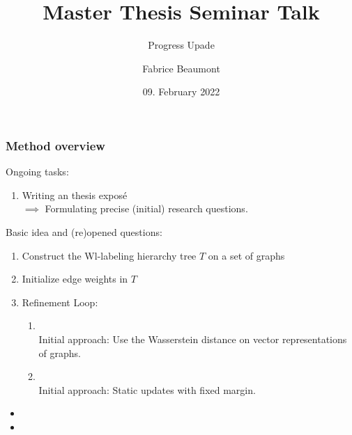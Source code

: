 

\title[MA Seminar Talk - Progress]{Master Thesis Seminar Talk}
\subtitle{Progress Upade}
\author[F. Beaumont]{Fabrice Beaumont}
\date{09. February 2022}



\begin{frame}
	\titlepage
\end{frame}

\begin{frame}
\frametitle{Method overview} \vspace{-1cm}
	Ongoing tasks:
	\begin{enumerate}
		\item Writing an thesis exposé\\
		$\implies$ Formulating precise (initial) research questions.
	\end{enumerate}

	Basic idea and (re)opened questions:
	\begin{enumerate}
		\item Construct the Wl-labeling hierarchy tree $T$ on a set of graphs
		\item Initialize edge weights in $T$
		\item Refinement Loop:
		\begin{enumerate}
			\item \color{red}{Evaluate the performance of the edge weights.}\\
			Initial approach: Use the Wasserstein distance on vector representations of graphs. \color{red}{How to get a differentiated feedback for the weight adjustments?}
			\item \color{red}{(How to) Update the edge weights.}\\
			Initial approach: Static updates with fixed margin.
		\end{enumerate}
	\end{enumerate}
	\hfill\newline
	\begin{itemize}		
		\item[] \hfill\newline
		\item[] \hfill\newline
	\end{itemize}
\end{frame}

